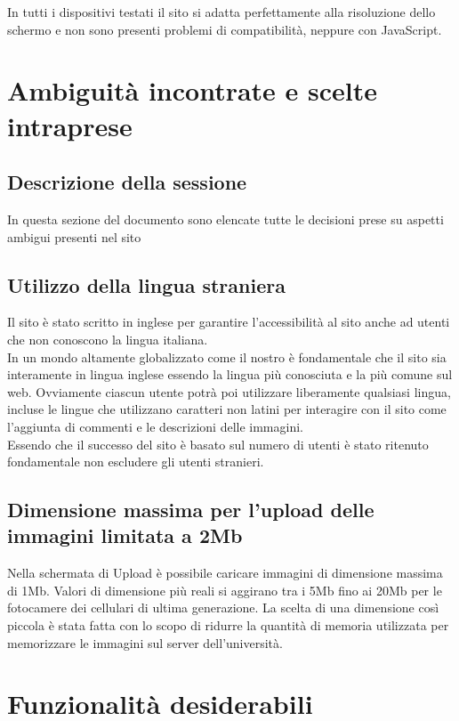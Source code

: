 \documentclass[openany, a4paper, 12pt]{report}
\begin{document}
				In tutti i dispositivi testati il sito si adatta perfettamente alla risoluzione dello schermo e non sono presenti problemi di compatibilità, neppure con JavaScript.\\

	\chapter{Ambiguità incontrate e scelte intraprese}
		\section{Descrizione della sessione}
			In questa sezione del documento sono elencate tutte le decisioni prese su aspetti ambigui presenti nel sito\\
		\section{Utilizzo della lingua straniera}
				Il sito è stato scritto in inglese per garantire l'accessibilità al sito anche ad utenti che non conoscono la lingua italiana.\\
				In un mondo altamente globalizzato come il nostro è fondamentale che il sito sia interamente in lingua inglese essendo la lingua più conosciuta e la più comune sul web. Ovviamente ciascun utente potrà poi utilizzare liberamente qualsiasi lingua, incluse le lingue che utilizzano caratteri non latini per interagire con il sito come l'aggiunta di commenti e le descrizioni delle immagini.\\
				Essendo che il successo del sito è basato sul numero di utenti è stato ritenuto fondamentale non escludere gli utenti stranieri.
		\section{Dimensione massima per l'upload delle immagini limitata a 2Mb}
				Nella schermata di Upload è possibile caricare immagini di dimensione massima di 1Mb. Valori di dimensione più reali si aggirano tra i 5Mb fino ai 20Mb per le fotocamere dei cellulari di ultima generazione. La scelta di una dimensione così piccola è stata fatta con lo scopo di ridurre la quantità di memoria utilizzata per memorizzare le immagini sul server dell'università.\\
			
	\chapter{Funzionalit\`{a} desiderabili}
\end{document}
